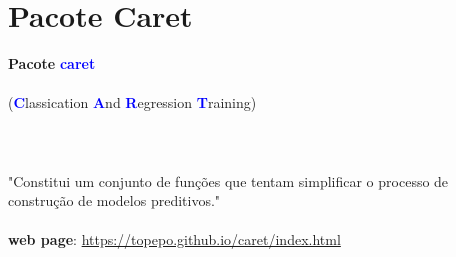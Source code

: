 \documentclass[12pt,ignorenonframetext,aspectratio=1610]{beamer}
\begin{document}

\section{Pacote Caret}

\begin{frame}[c]{}
	
	\begin{center}

	{\Huge \textbf{Pacote} \textcolor{blue}{\textbf{caret}}} \\~\\
	
	{\Large(\textcolor{blue}{\textbf{C}}lassication \textcolor{blue}{\textbf{A}}nd \textcolor{blue}{\textbf{R}}egression \textcolor{blue}{\textbf{T}}raining)} \\~\\
		
	\cite{kuhn2013applied, R-caret} \\~\\

	"Constitui um conjunto de funções que tentam simplificar o processo de construção de modelos preditivos." \\~\\
		
		
	\textbf{web page}: \href{https://topepo.github.io/caret/index.html}{https://topepo.github.io/caret/index.html}
	\end{center}
	
\end{frame}


	
\end{document}

